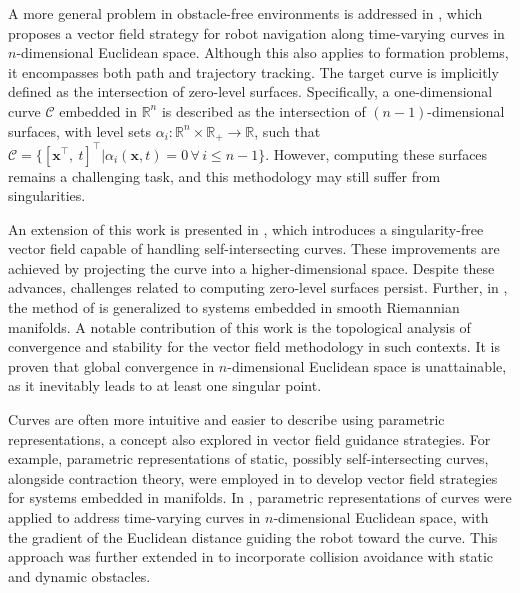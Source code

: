 A more general problem in obstacle-free environments is addressed in \citet{goncalves2010vectorfield}, which proposes a vector field strategy for robot navigation along time-varying curves in $n$-dimensional Euclidean space. Although this also applies to formation problems, it encompasses both path and trajectory tracking. The target curve is implicitly defined as the intersection of zero-level surfaces. Specifically, a one-dimensional curve $\mathcal{C}$ embedded in $\mathbb{R}^n$ is described as the intersection of $(n-1)$-dimensional surfaces, with level sets $\alpha_i:\mathbb{R}^n\times\mathbb{R}_+\to\mathbb{R}$, such that $\mathcal{C} = \{ [ \mathbf{x}^\top,\ t]^\top | \alpha_i(\mathbf{x}, t) = 0\,\forall\,i\le n-1 \}$. However, computing these surfaces remains a challenging task, and this methodology may still suffer from singularities.

An extension of this work is presented in \citet{yao2021singularity}, which introduces a singularity-free vector field capable of handling self-intersecting curves. These improvements are achieved by projecting the curve into a higher-dimensional space. Despite these advances, challenges related to computing zero-level surfaces persist. Further, in \citet{yao2022topological}, the method of \citet{goncalves2010vectorfield} is generalized to systems embedded in smooth Riemannian manifolds. A notable contribution of this work is the topological analysis of convergence and stability for the vector field methodology in such contexts. It is proven that global convergence in $n$-dimensional Euclidean space is unattainable, as it inevitably leads to at least one singular point.

Curves are often more intuitive and easier to describe using parametric representations, a concept also explored in vector field guidance strategies. For example, parametric representations of static, possibly self-intersecting curves, alongside contraction theory, were employed in \citet{Wu2018} to develop vector field strategies for systems embedded in manifolds. In \citet{Rezende2022}, parametric representations of curves were applied to address time-varying curves in $n$-dimensional Euclidean space, with the gradient of the Euclidean distance guiding the robot toward the curve. This approach was further extended in \citet{Nunes2022} to incorporate collision avoidance with static and dynamic obstacles.

